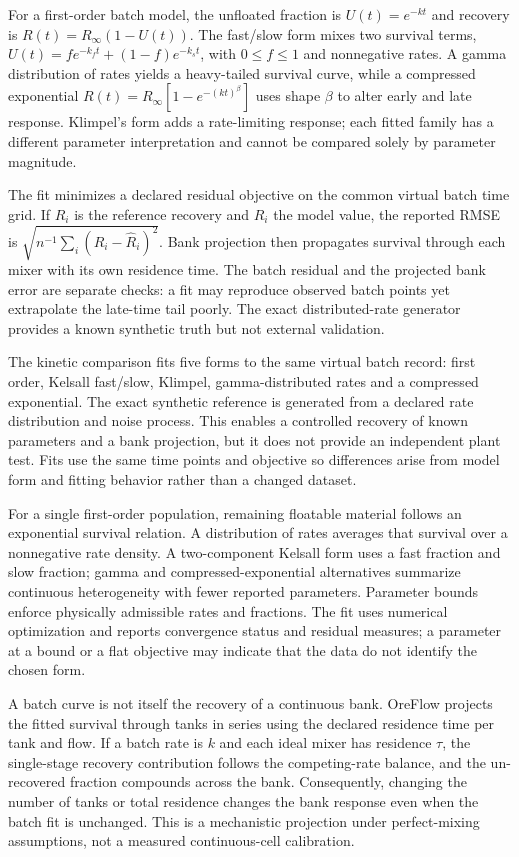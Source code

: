 \documentclass[10pt]{article}
\begin{document}
For a first-order batch model, the unfloated fraction is
\(U(t)=e^{-kt}\) and recovery is \(R(t)=R_\infty(1-U(t))\). The
fast/slow form mixes two survival terms,
\(U(t)=f e^{-k_f t}+(1-f)e^{-k_s t}\), with \(0\leq f\leq1\) and
nonnegative rates. A gamma distribution of rates yields a heavy-tailed
survival curve, while a compressed exponential
\(R(t)=R_\infty[1-e^{-(kt)^\beta}]\) uses shape \(\beta\) to alter early
and late response. Klimpel's form adds a rate-limiting response; each
fitted family has a different parameter interpretation and cannot be
compared solely by parameter magnitude.

The fit minimizes a declared residual objective on the common virtual
batch time grid. If \(R_i\) is the reference recovery and \(\hat R_i\)
the model value, the reported RMSE is
\(\sqrt{n^{-1}\sum_i(R_i-\hat R_i)^2}\). Bank projection then propagates
survival through each mixer with its own residence time. The batch
residual and the projected bank error are separate checks: a fit may
reproduce observed batch points yet extrapolate the late-time tail
poorly. The exact distributed-rate generator provides a known synthetic
truth but not external validation.

The kinetic comparison fits five forms to the same virtual batch record:
first order, Kelsall fast/slow, Klimpel, gamma-distributed rates and a
compressed exponential. The exact synthetic reference is generated from
a declared rate distribution and noise process. This enables a
controlled recovery of known parameters and a bank projection, but it
does not provide an independent plant test. Fits use the same time
points and objective so differences arise from model form and fitting
behavior rather than a changed dataset.

For a single first-order population, remaining floatable material
follows an exponential survival relation. A distribution of rates
averages that survival over a nonnegative rate density. A two-component
Kelsall form uses a fast fraction and slow fraction; gamma and
compressed-exponential alternatives summarize continuous heterogeneity
with fewer reported parameters. Parameter bounds enforce physically
admissible rates and fractions. The fit uses numerical optimization and
reports convergence status and residual measures; a parameter at a bound
or a flat objective may indicate that the data do not identify the
chosen form.

A batch curve is not itself the recovery of a continuous bank. OreFlow
projects the fitted survival through tanks in series using the declared
residence time per tank and flow. If a batch rate is \(k\) and each
ideal mixer has residence \(\tau\), the single-stage recovery
contribution follows the competing-rate balance, and the un-recovered
fraction compounds across the bank. Consequently, changing the number of
tanks or total residence changes the bank response even when the batch
fit is unchanged. This is a mechanistic projection under perfect-mixing
assumptions, not a measured continuous-cell calibration.
\end{document}
